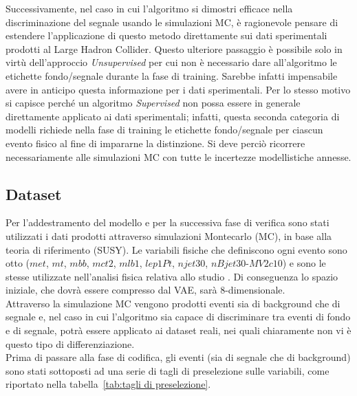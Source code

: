 Successivamente, nel caso in cui l'algoritmo si dimostri efficace nella discriminazione del segnale usando le simulazioni MC, è ragionevole pensare di estendere l'applicazione di questo metodo direttamente sui dati sperimentali prodotti al Large Hadron Collider. Questo ulteriore passaggio è possibile solo in virtù dell'approccio \textit{Unsupervised} per cui non è necessario dare all'algoritmo le etichette fondo/segnale durante la fase di training. Sarebbe infatti impensabile avere in anticipo questa informazione per i dati sperimentali. Per lo stesso motivo si capisce perché un algoritmo \textit{Supervised} non possa essere in generale direttamente applicato ai dati sperimentali; infatti, questa seconda categoria di modelli richiede nella fase di training le etichette fondo/segnale per ciascun evento fisico al fine di impararne la distinzione. Si deve perciò ricorrere necessariamente alle simulazioni MC con tutte le incertezze modellistiche annesse.
\newpage

\subsection{Dataset}
\label{dataset}
Per l'addestramento del modello e per la successiva fase di verifica sono stati utilizzati i dati prodotti attraverso simulazioni Montecarlo (MC), in base alla teoria di riferimento (SUSY). Le variabili fisiche che definiscono ogni evento sono otto ($\textit{met}$, $\textit{mt}$, $\textit{mbb}$, $\textit{mct2}$, $\textit{mlb1}$, $\textit{lep1Pt}$, $\textit{njet30}$, $\textit{nBjet30-MV2c10}$) e sono le stesse utilizzate nell'analisi fisica relativa allo studio \cite{susy_alberto}. Di conseguenza lo spazio iniziale, che dovrà essere compresso dal VAE, sarà 8-dimensionale. \\
Attraverso la simulazione MC vengono prodotti eventi sia di background che di segnale e, nel caso in cui l'algoritmo sia capace di discriminare tra eventi di fondo e di segnale, potrà essere applicato ai dataset reali, nei quali chiaramente non vi è questo tipo di differenziazione.\\ 
Prima di passare alla fase di codifica, gli eventi (sia di segnale che di background) sono stati sottoposti ad una serie di tagli di preselezione sulle variabili, come riportato nella tabella~\ref{tab:tagli di preselezione}.

